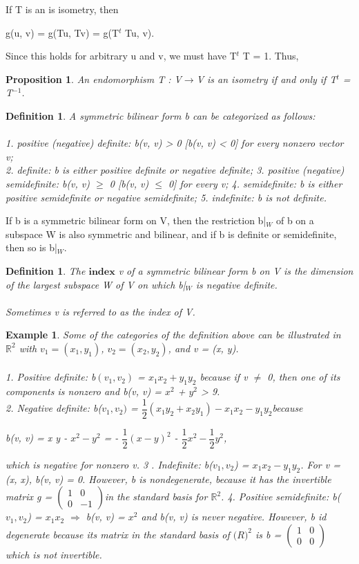 \documentclass[12pt,a4paper]{article}
\newtheorem{defn}[thm]{Definition}
\newtheorem{exmp}{Example}[section]
\newtheorem{prop}{Proposition}
\begin{document}
If T is an is isometry, then
\begin{center}
g(u, v) = g(Tu, Tv) = g(T$^t$ Tu, v).
\end{center}
Since this holds for arbitrary u and v, we must have T$^t$
T = 1. Thus,
\begin{prop}
An endomorphism T : V$\to$V is an isometry if and only
if T$^t$ = T$^{-1}$.
\end{prop}
\begin{defn} 
A symmetric bilinear form b can be categorized as follows:
\\\\
1. positive (negative) definite: b(v, v) > 0 [b(v, v) < 0] for every
nonzero vector v;\\
2. definite: b is either positive definite or negative definite;
3. positive (negative) semidefinite: b(v, v) $\geq$ 0 [b(v, v) $\leq$ 0] for every v;
4. semidefinite: b is either positive semidefinite or negative semidefinite;
5. indefinite: b is not definite.
\end{defn}
If b is a symmetric bilinear form on V, then the restriction b|$_W$ of b on a
subspace W is also symmetric and bilinear, and if b is definite or semidefinite, then so is b|$_W$.
\begin{defn}
The $\textbf{index}$ v of a symmetric bilinear form b on V is the
dimension of the largest subspace W of V on which b|$_W$ is negative definite.\\\\
Sometimes v is referred to as the index of V.
\end{defn}
\begin{exmp}
Some of the categories of the definition above can be illustrated in $\mathbb{R}^2$ with $v_1 = (x_1, y_1)$, $v_2 = (x_2, y_2)$, and v = (x, y).\\\\
1. Positive definite: b$(v_1, v_2)$ = $x_1 x_2 + y_1 y_2$ because if v $\ne$ 0, then one of its components is nonzero and b(v, v) = $x^2$ + $y^2$ > 9. \\
2. Negative definite: b($v_1, v_2)$ = $\dfrac{1}{2}(x_1 y_2 + x_2 y_1) - x_1 x_2 - y_1 y_2 $because 
\begin{center}
b(v, v) = x y - $x^2 - y^2$ = - $\dfrac{1}{2}(x - y)^2$ - $\dfrac{1}{2}x^2 -\dfrac{1}{2} y^2$,
\end{center}
which is negative for nonzero v.
3 . Indefinite: b($v_1,v_2$) = $x_1 x_2 - y_1 y_2$. For v = (x, x), b(v, v) = 0. However, b is nondegenerate, because it has the invertible matrix g = 
$\begin{pmatrix}
1 & 0 \\
0 & -1 
\end{pmatrix} $in the standard basis for $\mathbb{R}^2$.
4. Positive semidefinite: b($v_1, v_2$) = $x_1 x_2$ $\Rightarrow$ b(v, v) = $x ^2$ and b(v, v) is never negative. However, b id degenerate because its matrix in the standard basis of $\mathbb(R)^2$ is b = 
$\begin{pmatrix}
1 & 0\\
0 & 0
\end{pmatrix}$
which is not invertible.
\end{exmp}
\end{document}

